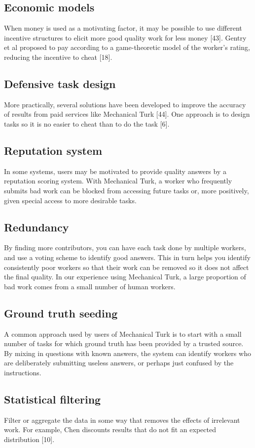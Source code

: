 \documentclass{sig-alternate}
\begin{document}
\subsection*{Economic models}
When money is used as a motivating factor, it may be possible to use different incentive structures to elicit more good quality work for less money [43]. Gentry et al proposed to pay according to a game-theoretic model of the worker’s rating, reducing the incentive to cheat [18].
\subsection*{Defensive task design}
More practically, several solutions have been developed to improve the accuracy of results from paid services like Mechanical Turk [44]. One approach is to design tasks so it is no easier to cheat than to do the task [6].
\subsection*{Reputation system}
In some systems, users may be motivated to provide quality answers by a reputation scoring system. With Mechanical Turk, a worker who frequently submits bad work can be blocked from accessing future tasks or, more positively, given special access to more desirable tasks.
\subsection*{Redundancy}
By finding more contributors, you can have each task done by multiple workers, and use a voting scheme to identify good answers. This in turn helps you identify consistently poor workers so that their work can be removed so it does not affect the final quality. In our experience using Mechanical Turk, a large proportion of bad work comes from a small number of human workers.
\subsection*{Ground truth seeding}
A common approach used by users of Mechanical Turk is to start with a small number of tasks for which ground truth has been provided by a trusted source. By mixing in questions with known answers, the system can identify workers who are deliberately submitting useless answers, or perhaps just confused by the instructions.
\subsection*{Statistical filtering}
Filter or aggregate the data in some way that removes the effects of irrelevant work. For example, Chen discounts results that do not fit an expected distribution [10].
\end{document}
